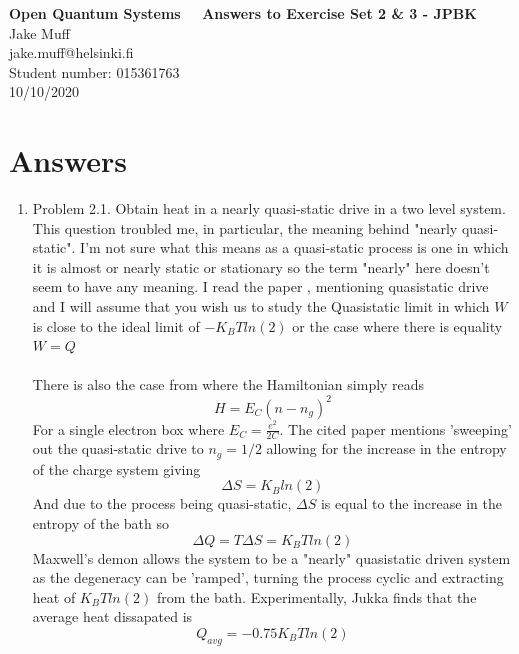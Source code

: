 \documentclass[12pt]{article}
\begin{document}
\normalsize

\baselineskip 14pt

\begin{center}
{\Large {\bf Open Quantum Systems \ \  Answers to Exercise Set 2 \& 3 - JPBK }}\\
{\large { Jake Muff}}\\
jake.muff@helsinki.fi \\
{Student number: 015361763}\\
{10/10/2020}
\end{center}


\section{Answers}
\begin{enumerate}

\item Problem 2.1. Obtain heat in a nearly quasi-static drive in a two level system.
\\
This question troubled me, in particular, the meaning behind "nearly quasi-static". I'm not sure what this means as a quasi-static process is one in which it is almost or nearly static or stationary so the term "nearly" here doesn't seem to have any meaning. 
I read the paper \cite{4}, mentioning quasistatic drive and I will assume that you wish us to study the Quasistatic limit in which $W$ is close to the ideal limit of $-K_B T ln(2)$ or the case where there is equality $W = Q$ 
\\
\\
There is also the case from where the Hamiltonian simply reads  \cite{10}
$$ H = E_C (n-n_g )^2 $$
For a single electron box where $E_C = \frac{e^2}{2C}$. The cited paper mentions 'sweeping' out the quasi-static drive to $n_g = 1/2$ allowing for the increase in the entropy of the charge system giving 
$$ \Delta S = K_B ln(2) $$ 
And due to the process being quasi-static, $\Delta S$ is equal to the increase in the entropy of the bath so
$$ \Delta Q = T \Delta S = K_B T ln(2) $$ 
Maxwell's demon allows the system to be a "nearly" quasistatic driven system as the degeneracy can be 'ramped', turning the process cyclic and extracting heat of $K_B T ln(2) $ from the bath. Experimentally, Jukka finds that the average heat dissapated is 
$$ Q_{avg} = -0.75 K_B T ln(2) $$ 




\end{enumerate}
\end{document}
